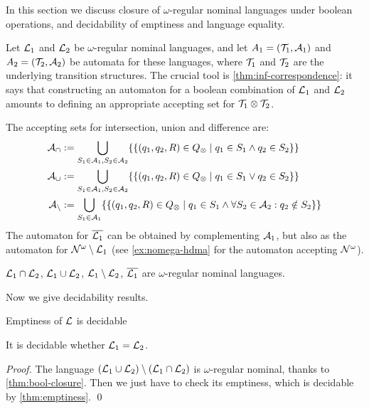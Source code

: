 \newcommand{\compl}[1]{\overline{#1}}
 
In this section we discuss closure of $\omega$-regular nominal languages under boolean operations, and decidability of emptiness and language equality.

Let $\mathcal{L}_1$ and $\mathcal{L}_2$ be $\omega$-regular nominal languages, and let $A_1 = (\mathcal{T}_1,\mathcal{A}_1)$  and $A_2 = (\mathcal{T}_2,\mathcal{A}_2)$ be automata for these languages, where $\mathcal{T}_1$ and $\mathcal{T}_2$ are the underlying transition structures.
The crucial tool is \cref{thm:inf-correspondence}: it says that constructing an automaton for a boolean combination of $\mathcal{L}_1$ and $\mathcal{L}_2$ amounts to defining an appropriate accepting set for $\mathcal{T}_1 \otimes \mathcal{T}_2$.

The accepting sets for intersection, union and difference are:
%
\begin{align*}
	\mathcal{A}_\cap &:= \bigcup_{S_1 \in \mathcal{A}_1,S_2 \in \mathcal{A}_2 } \{\{ (q_1,q_2,R) \in Q_{\otimes} \mid q_1 \in S_1 \land q_2 \in S_2 \}\} 
	\\
	\mathcal{A}_\cup &:= \bigcup_{S_1 \in \mathcal{A}_1,S_2 \in \mathcal{A}_2 } \{\{(q_1,q_2,R) \in Q_{\otimes} \mid q_1 \in S_1 \lor q_2 \in S_2 \}\} 
	\\
	\mathcal{A}_{\setminus} &:= \bigcup_{S_1 \in \mathcal{A}_1} \{\{ (q_1,q_2,R) \in Q_{\otimes} \mid q_1 \in S_1 \land \forall S_2 \in \mathcal{A}_2 : q_2 \notin S_2 \}\}
\end{align*}
%
The automaton for $\compl{\Lang_1}$ can be obtained by complementing $\mathcal{A}_1$, but also as the automaton for $\mathcal{N}^\omega \setminus \mathcal{L}_1$ (see \cref{ex:nomega-hdma} for the automaton accepting $\mathcal{N}^\omega$).


\begin{theorem}
$\mathcal{L}_1 \cap \mathcal{L}_2$, $\mathcal{L}_1 \cup \mathcal{L}_2$, $\mathcal{L}_1 \setminus \mathcal{L}_2$, $\compl{\Lang_1}$ are $\omega$-regular nominal languages.
\label{thm:bool-closure}
\end{theorem}
Now we give decidability results.
%
\begin{theorem}
Emptiness of $\mathcal{L}$ is decidable
\label{thm:emptiness}
\end{theorem}

\begin{theorem}
It is decidable whether $\mathcal{L}_1 = \mathcal{L}_2$.
\end{theorem}

\begin{proof}
The language $(\mathcal{L}_1 \cup \mathcal{L}_2) \setminus (\mathcal{L}_1 \cap \mathcal{L}_2 )$ is $\omega$-regular nominal, thanks to \cref{thm:bool-closure}. Then we just have to check its emptiness, which is decidable by \cref{thm:emptiness}.
\qed
\end{proof}
